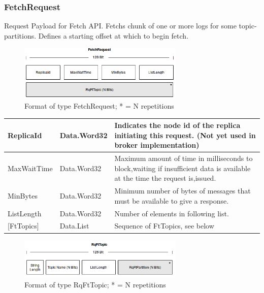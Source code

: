 \subsubsection{FetchRequest}
\label{subsubsec:protocol-fetchrequest}

Request Payload for Fetch API. Fetchs chunk of one or more logs for some
topic-partitions. Defines a starting offset at which to begin fetch. 

\begin{figure}[H]
    \centering
    \includegraphics[width=0.7\textwidth]{images/impl-prot-types-fetchRequest.png}
    \caption{Format of type FetchRequest; * = N repetitions }
    \label{fig:impl-prot-types-fetchRequest}
\end{figure}

\begin{table}[H]
\centering
\begin{tabular}{ l  l  p{11cm} }
\hline
ReplicaId      & Data.Word32 & Indicates the node id of the replica initiating this request. (Not yet used in broker implementation)                        \\ \hline
MaxWaitTime    & Data.Word32 & Maximum amount of time in milliseconds to block,waiting if insufficient data is available at the time the request is,issued. \\ \hline
MinBytes       & Data.Word32 & Minimum number of bytes of messages that must be available to give a response.                                               \\ \hline
ListLength     & Data.Word32 & Number of elements in following list.                                                                                        \\ \hline
{[}FtTopics{]} & Data.List   & Sequence of FtTopics, see below                                                                                              \\ \hline
\end{tabular}
\end{table}

\begin{figure}[H]
    \centering
    \includegraphics[width=0.7\textwidth]{images/impl-prot-types-ftTopic.png}
    \caption{Format of type RqFtTopic; * = N repetitions }
    \label{fig:impl-prot-types-ftTopic}
\end{figure}

